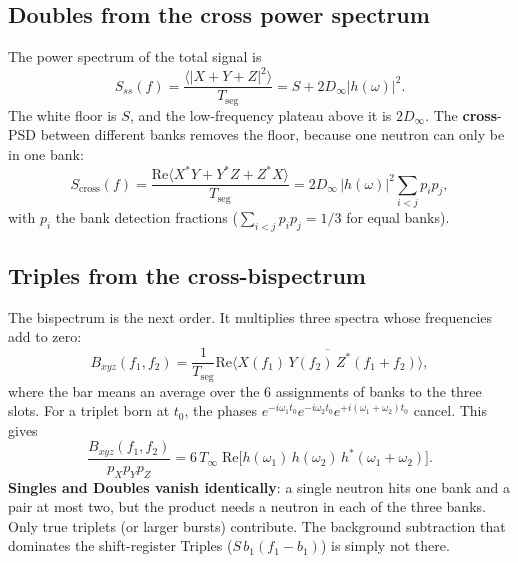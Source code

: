 \documentclass[11pt,a4paper]{article}
\newcommand{\Dinf}{D_\infty}
\newcommand{\Tinf}{T_\infty}
\begin{document}
\subsection{Doubles from the cross power spectrum}
The power spectrum of the total signal is
\begin{equation}
S_{ss}(f)=\frac{\langle|X+Y+Z|^2\rangle}{T_{\text{seg}}}=S+2\Dinf|h(\omega)|^2 .
\end{equation}
The white floor is $S$, and the low-frequency plateau above it is $2\Dinf$. The
\textbf{cross}-PSD between different banks removes the floor, because one neutron can only
be in one bank:
\begin{equation}
S_{\text{cross}}(f)=\frac{\text{Re}\langle X^*Y+Y^*Z+Z^*X\rangle}{T_{\text{seg}}}
=2\Dinf\,|h(\omega)|^2\sum_{i<j}p_ip_j ,
\end{equation}
with $p_i$ the bank detection fractions ($\sum_{i<j}p_ip_j=1/3$ for equal banks).

\subsection{Triples from the cross-bispectrum}
The bispectrum is the next order. It multiplies three spectra whose frequencies add to zero:
\begin{equation}
B_{xyz}(f_1,f_2)=\frac{1}{T_{\text{seg}}}\text{Re}\Big\langle\overline{X(f_1)\,Y(f_2)\,Z^*(f_1+f_2)}\Big\rangle ,
\end{equation}
where the bar means an average over the 6 assignments of banks to the three slots. For a
triplet born at $t_0$, the phases $e^{-i\omega_1t_0}e^{-i\omega_2t_0}e^{+i(\omega_1+\omega_2)t_0}$
cancel. This gives
\begin{equation}
\frac{B_{xyz}(f_1,f_2)}{p_Xp_Yp_Z}=6\,\Tinf\;\text{Re}\big[h(\omega_1)\,h(\omega_2)\,h^*(\omega_1+\omega_2)\big].
\end{equation}
\textbf{Singles and Doubles vanish identically}: a single neutron hits one bank and a pair
at most two, but the product needs a neutron in each of the three banks. Only true triplets
(or larger bursts) contribute. The background subtraction that dominates the shift-register
Triples ($S\,b_1(f_1-b_1)$) is simply not there.
\end{document}
